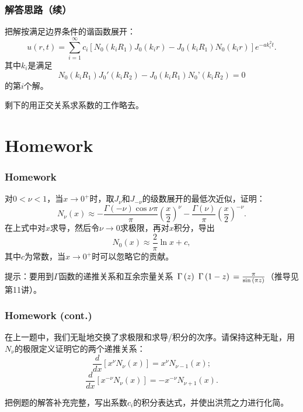 \documentclass[CJK]{beamer}
\begin{document}
\begin{frame}
\frametitle{解答思路（续）}

把解按满足边界条件的谐函数展开：
$$ u(r, t) = \sum_{i=1}^\infty c_i\left[N_0(k_iR_1) J_0(k_ir) - J_0(k_iR_1) N_0(k_ir)\right]e^{-ak_i^2t} .$$
其中$k_i$是满足
$$ N_0(k_iR_1) J_0'(k_iR_2) - J_0(k_iR_1) N_0’(k_iR_2) = 0 $$
的第$i$个解。

\skiplines

剩下的用正交关系求系数的工作略去。

\end{frame}





\section{Homework}

\begin{frame}
\frametitle{Homework}

\bitem
\item{对$0<\nu<1$，当$x\rightarrow 0^+$时，取$J_\nu$和$J_{-\nu}$的级数展开的最低次近似，证明：
  $$N_\nu(x) \approx -\frac{\Gamma(-\nu)\cos{\nu\pi}}{\pi}\left(\frac{x}{2}\right)^\nu - \frac{\Gamma(\nu)}{\pi}\left(\frac{x}{2}\right)^{-\nu}. $$
  在上式中对$x$求导，然后令$\nu\rightarrow 0$求极限，再对$x$积分，导出
  $$ N_0(x)\approx \frac{2}{\pi}\ln x + c,$$
  其中$c$为常数，当$x\rightarrow 0^+$时可以忽略它的贡献。

  \skiplines
      {\small \darkgreen 提示：要用到$\Gamma$函数的递推关系和互余宗量关系
        $\,\Gamma\left( z \right)\,\,\Gamma\left( 1-z \right)\,=\frac{\pi}{\sin{(\pi z)}}$（推导见第11讲）。}}
  \eitem

\end{frame}


\begin{frame}
\frametitle{Homework (cont.)}
\bitem
\item{在上一题中，我们无耻地交换了求极限和求导/积分的次序。请保持这种无耻，用$N_\nu$的极限定义证明它的两个递推关系：
  $$ \frac{d}{dx}\left[x^\nu N_\nu(x)\right] = x^\nu N_{\nu -1}(x);$$
  $$ \frac{d}{dx}\left[x^{-\nu} N_\nu(x)\right] = -x^{-\nu} N_{\nu +1}(x).  $$
}
\item{把例题的解答补充完整，写出系数$c_i$的积分表达式，并使出洪荒之力进行化简。}  \eitem
\end{frame}

\ech
\end{document}
